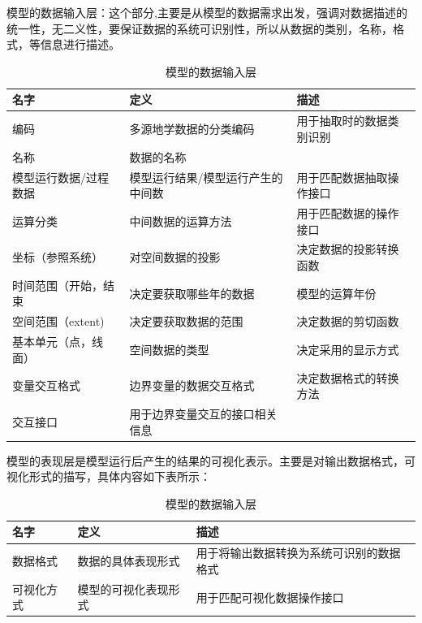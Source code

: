 \documentclass[master]{njnuthesis}
\begin{document}
模型的数据输入层：这个部分,主要是从模型的数据需求出发，强调对数据描述的统一性，无二义性，要保证数据的系统可识别性，所以从数据的类别，名称，格式，等信息进行描述。
\begin{table}[h]
\caption{模型的数据输入层} \label{table2}
\begin{center}
\begin{tabular}{lll}
\hline
 名字                   &  定义                               &  描述                       \\
\hline
 编码                   &  多源地学数据的分类编码             &  用于抽取时的数据类别识别   \\
 名称                   &  数据的名称                         &                             \\
 模型运行数据/过程数据  &  模型运行结果/模型运行产生的中间数  &  用于匹配数据抽取操作接口   \\
 运算分类               &  中间数据的运算方法                 &  用于匹配数据的操作接口     \\
 坐标（参照系统）       &  对空间数据的投影                   &  决定数据的投影转换函数     \\
 时间范围（开始，结束   &  决定要获取哪些年的数据             &  模型的运算年份             \\
 空间范围（extent)      &  决定要获取数据的范围               &  决定数据的剪切函数         \\
 基本单元（点，线面）   &  空间数据的类型                     &  决定采用的显示方式         \\
 变量交互格式           &  边界变量的数据交互格式             &  决定数据格式的转换方法     \\
 交互接口               &  用于边界变量交互的接口相关信息     &                             \\
\hline
\end{tabular}
\end{center}
\end{table}

模型的表现层是模型运行后产生的结果的可视化表示。主要是对输出数据格式，可视化形式的描写，具体内容如下表所示：

\begin{table}[ht]
\caption{模型的数据输入层} \label{table2}
\begin{center}
\begin{tabular}{lll}
\hline
 名字        &  定义                  &  描述                                        \\
\hline
 数据格式    &  数据的具体表现形式    &  用于将输出数据转换为系统可识别的数据格式    \\
 可视化方式  &  模型的可视化表现形式  &  用于匹配可视化数据操作接口                  \\
\hline
\end{tabular}
\end{center}
\end{table}
\end{document}
